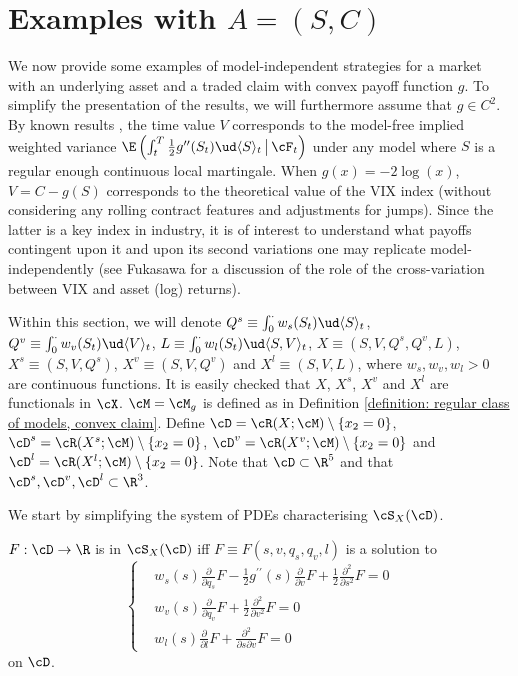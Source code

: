 \documentclass[11pt]{article}
\begin{document}
\section{Examples with $A = (S,C)$}
\label{section: examples with convex claim}

We now provide some examples of model-independent strategies for a market with an underlying asset and a traded claim with convex payoff function $g$. To simplify the presentation of the results, we will furthermore assume that $g \in C^2$. By known results \cite{Carr-Lee:volatility, Carr-Lee:semimartingales, Fukasawa, Hobson-Klimmek, Neuberger:log-contract}, the time value $V$ corresponds to the model-free implied weighted variance $\E \left( \int_t^T \frac{1}{2}g^{\prime\prime}(S_t) \ud \langle S \rangle_t \, \big{|} \, \cF_t \right)$ under any model where $S$ is a regular enough continuous local martingale. When $g(x) = - 2 \log(x)$, $V = C - g(S)$ corresponds to the theoretical value of the VIX index (without considering any rolling contract features and adjustments for jumps). Since the latter is a key index in industry, it is of interest to understand what payoffs contingent upon it and upon its second variations one may replicate model-independently (see Fukasawa \cite{Fukasawa} for a discussion of the role of the cross-variation between VIX and asset (log) returns). 

Within this section, we will denote $Q^s \equiv \int_0^\cdot w_s(S_t) \ud \langle S \rangle_t$, $Q^v \equiv \int_0^\cdot w_v(S_t) \ud \langle V \rangle_t$, $L \equiv \int_0^\cdot w_l(S_t) \ud \langle S, V \rangle_t$, $X \equiv (S, V, Q^s, Q^v, L)$, $X^s \equiv (S, V, Q^s)$, $X^v \equiv (S, V,Q^v)$ and $X^l \equiv (S, V, L)$, where $w_s, w_v, w_l > 0$ are continuous functions. It is easily checked that $X$, $X^s$, $X^v$ and $X^l$ are functionals in $\cX$. $\cM = \cM_g$ is defined as in Definition \ref{definition: regular class of models, convex claim}. Define $\cD = \cR(X; \cM) \setminus \{x_2 = 0\}$, $\cD^s = \cR(X^s; \cM) \setminus \{x_2 = 0\}$, $\cD^v = \cR(X^v; \cM) \setminus \{x_2 = 0\}$ and $\cD^l = \cR(X^l; \cM) \setminus \{x_2 = 0\}$. Note that $\cD \subset \R^5$ and that $\cD^s, \cD^v, \cD^l \subset \R^3$.

We start by simplifying the system of PDEs characterising $\cS_X(\cD)$.

\begin{lemma}
\label{lemma: PDEs for 5-d}
$F: \cD \to \R$ is in $\cS_X(\cD)$ iff $F \equiv F(s, v, q_s, q_v, l)$ is a solution to
$$
\begin{cases}
&w_s(s) \frac{\partial}{\partial q_s} F - \frac{1}{2} g^{\prime\prime}(s) \frac{\partial}{\partial v} F + \frac{1}{2} \frac{\partial^2}{\partial s^2} F = 0 \\
&w_v(s) \frac{\partial}{\partial q_v} F + \frac{1}{2} \frac{\partial^2}{\partial v^2} F = 0 \\
&w_l(s) \frac{\partial}{\partial l} F + \frac{\partial^2}{\partial s \partial v} F = 0
\end{cases}
$$
on $\cD$.
\end{lemma}
\end{document}
